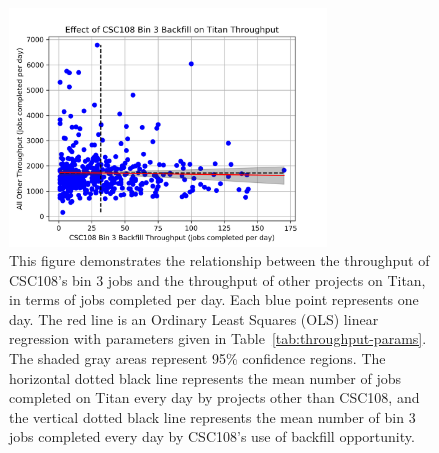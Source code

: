 \begin{figure}
  \includegraphics[width=0.75\textwidth]{images/linfit-throughput-bin3.png}
\caption{This figure demonstrates the relationship between the throughput of
CSC108's bin 3 jobs and the throughput of other projects on Titan, in terms of
jobs completed per day. Each blue point represents one day. The red line is an
Ordinary Least Squares (OLS) linear regression with parameters given in
Table~\ref{tab:throughput-params}. The shaded gray areas represent 95\%
confidence regions. The horizontal dotted black line represents the mean number
of jobs completed on Titan every day by projects other than CSC108, and the
vertical dotted black line represents the mean number of bin 3 jobs completed
every day by CSC108's use of backfill opportunity.}
\label{fig:throughput-bin3}
\end{figure}

